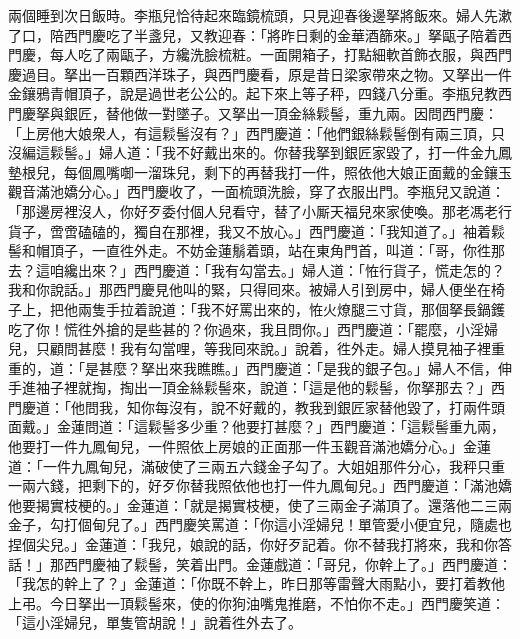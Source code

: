 兩個睡到次日飯時。李瓶兒恰待起來臨鏡梳頭，只見迎春後邊拏將飯來。婦人先漱了口，陪西門慶吃了半盞兒，又教迎春：「將昨日剩的金華酒篩來。」拏甌子陪着西門慶，每人吃了兩甌子，方纔洗臉梳粧。一面開箱子，打點細軟首飾衣服，與西門慶過目。拏出一百顆西洋珠子，{}與西門慶看，原是昔日梁家帶來之物。又拏出一件金鑲鴉青帽頂子，說是過世老公公的。起下來上等子秤，四錢八分重。李瓶兒教西門慶拏與銀匠，替他做一對墜子。又拏出一頂金絲鬏髻，重九兩。因問西門慶：「上房他大娘衆人，有這鬏髻沒有？」西門慶道：「他們銀絲鬏髻倒有兩三頂，只沒編這鬏髻。」{}婦人道：「我不好戴出來的。你替我拏到銀匠家毀了，打一件金九鳳墊根兒，每個鳳嘴啣一溜珠兒，剩下的再替我打一件，照依他大娘正面戴的金鑲玉觀音滿池嬌分心。」西門慶收了，一面梳頭洗臉，穿了衣服出門。李瓶兒又說道：「那邊房裡沒人，你好歹委付個人兒看守，替了小厮天福兒來家使喚。那老馮老行貨子，啻啻磕磕的，獨自在那裡，我又不放心。」西門慶道：「我知道了。」袖着鬏髻和帽頂子，一直徃外走。不妨金蓮鬅着頭，站在東角門首，{}叫道：「哥，你徃那去？這咱纔出來？」{}西門慶道：「我有勾當去。」婦人道：「恠行貨子，慌走怎的？我和你說話。」那西門慶見他叫的緊，只得囘來。被婦人引到房中，婦人便坐在椅子上，把他兩隻手拉着說道：「我不好罵出來的，恠火燎腿三寸貨，那個拏長鍋鑊吃了你！慌徃外搶的是些甚的？你過來，我且問你。」西門慶道：「罷麼，小淫婦兒，只顧問甚麼！我有勾當哩，等我囘來說。」說着，徃外走。婦人摸見袖子裡重重的，{}道：「是甚麼？拏出來我瞧瞧。」西門慶道：「是我的銀子包。」{}婦人不信，伸手進袖子裡就掏，掏出一頂金絲鬏髻來，說道：「這是他的鬏髻，{}你拏那去？」西門慶道：「他問我，知你每沒有，說不好戴的，教我到銀匠家替他毀了，打兩件頭面戴。」金蓮問道：「這鬏髻多少重？他要打甚麼？」西門慶道：「這鬏髻重九兩，他要打一件九鳳甸兒，一件照依上房娘的正面那一件玉觀音滿池嬌分心。」金蓮道：「一件九鳳甸兒，滿破使了三兩五六錢金子勾了。{}大姐姐那件分心，我秤只重一兩六錢，{}把剩下的，好歹你替我照依他也打一件九鳳甸兒。」西門慶道：「滿池嬌他要揭實枝梗的。」金蓮道：「就是揭實枝梗，使了三兩金子滿頂了。還落他二三兩金子，{}勾打個甸兒了。」西門慶笑罵道：「你這小淫婦兒！單管愛小便宜兒，隨處也捏個尖兒。」金蓮道：「我兒，娘說的話，你好歹記着。你不替我打將來，我和你答話！」那西門慶袖了鬏髻，笑着出門。金蓮戲道：「哥兒，你幹上了。」西門慶道：「我怎的幹上了？」金蓮道：「你既不幹上，昨日那等雷聲大雨點小，要打着教他上弔。今日拏出一頂鬏髻來，使的你狗油嘴鬼推磨，不怕你不走。」{}西門慶笑道：「這小淫婦兒，單隻管胡說！」說着徃外去了。

